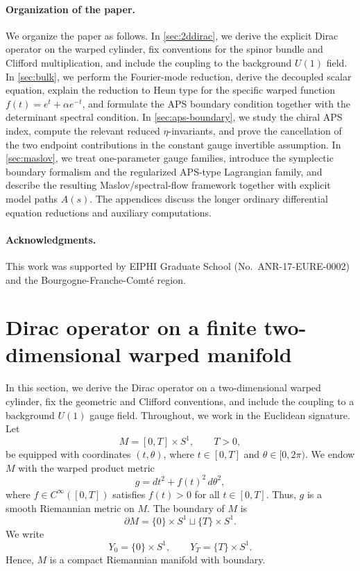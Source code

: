 \documentclass[11pt]{article}
\theoremstyle{definition}
\numberwithin{equation}{section}
\begin{document}
\paragraph{Organization of the paper.}
We organize the paper as follows. In \autoref{sec:2ddirac}, we derive the explicit Dirac operator on the warped cylinder, fix conventions for the spinor bundle and Clifford multiplication, and include the coupling to the background \(U(1)\) field. In \autoref{sec:bulk}, we perform the Fourier-mode reduction, derive the decoupled scalar equation, explain the reduction to Heun type for the specific warped function \(f(t)=e^t+\alpha e^{-t}\), and formulate the APS boundary condition together with the determinant spectral condition. In \autoref{sec:aps-boundary}, we study the chiral APS index, compute the relevant reduced \(\eta\)-invariants, and prove the cancellation of the two endpoint contributions in the constant gauge invertible assumption. In \autoref{sec:maslov}, we treat one-parameter gauge families, introduce the symplectic boundary formalism and the regularized APS-type Lagrangian family, and describe the resulting Maslov/spectral-flow framework together with explicit model paths \(A(s)\). The appendices discuss the longer ordinary differential equation reductions and auxiliary computations.




\paragraph{Acknowledgments.}
This work was supported by EIPHI Graduate School (No.~ANR-17-EURE-0002) and the Bourgogne-Franche-Comté region.

\section{Dirac operator on a finite two-dimensional warped manifold}\label{sec:2ddirac}
In this section, we derive the Dirac operator on a two-dimensional warped cylinder, fix the geometric and Clifford conventions, and include the coupling to a background $U(1)$ gauge field. Throughout, we work in the Euclidean signature.
Let 
\begin{equation}
M=[0,T]\times S^1,
\qquad T>0,
\end{equation}
be equipped with coordinates \((t,\theta)\), where \(t\in[0,T]\) and \(\theta\in[0,2\pi)\). We endow \(M\) with the warped product metric
\begin{equation}
g=dt^2+f(t)^2\,d\theta^2,
\end{equation}
where \(f\in C^\infty([0,T])\) satisfies \(f(t)>0\) for all \(t\in[0,T]\). Thus, \(g\) is a smooth Riemannian metric on \(M\). The boundary of \(M\) is
\begin{equation}
\partial M=\{0\}\times S^1\sqcup \{T\}\times S^1.
\end{equation}
We write
\begin{equation}
Y_0=\{0\}\times S^1,\qquad Y_T=\{T\}\times S^1.
\end{equation}
Hence, \(M\) is a compact Riemannian manifold with boundary.
\end{document}
